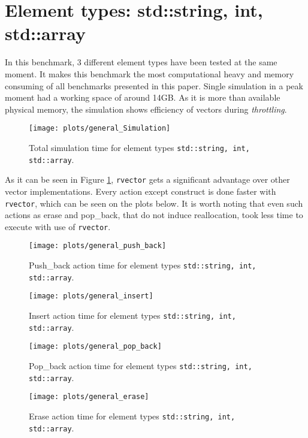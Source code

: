 \documentclass[inz, english, shortabstract]{iithesis}
\begin{document}
\clearpage
\section{Element types: std::string, int, std::array}
In this benchmark, 3 different element types have been tested at the same moment. It makes this benchmark the most computational heavy and memory consuming of all benchmarks presented in this paper. Single simulation in a peak moment had a working space of around 14GB. As it is more than available physical memory,  the simulation shows efficiency of vectors during \emph{throttling}.

\begin{figure}[h!]
\texttt{[image: plots/general\_Simulation]}
\caption{Total simulation time for element types \lstinline{std::string, int, std::array}.}
\label{general_simulation}
\end{figure}

As it can be seen in Figure \ref{general_simulation}, {\tt rvector} gets a significant advantage over other vector implementations. Every action except construct is done faster with {\tt rvector}, which can be seen on the plots below. It is worth noting that even such actions as erase and pop\_back, that do not induce reallocation, took less time to execute with use of {\tt rvector}. 

\begin{figure}[h!]
\texttt{[image: plots/general\_push\_back]}
\caption{Push\_back action time for element types \lstinline{std::string, int, std::array}.}
\label{general_push_back}
\end{figure}

\begin{figure}[h!]
\texttt{[image: plots/general\_insert]}
\caption{Insert action time for element types \lstinline{std::string, int, std::array}.}
\label{general_insert}
\end{figure}

\begin{figure}[h!]
\texttt{[image: plots/general\_pop\_back]}
\caption{Pop\_back action time for element types \lstinline{std::string, int, std::array}.}
\label{general_pop_back}
\end{figure}

\begin{figure}[h!]
\texttt{[image: plots/general\_erase]}
\caption{Erase action time for element types \lstinline{std::string, int, std::array}.}
\label{general_erase}
\end{figure}
\end{document}
